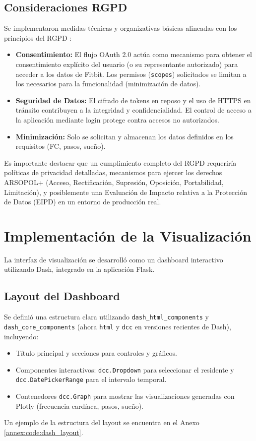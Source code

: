 \subsection{Consideraciones RGPD}
Se implementaron medidas técnicas y organizativas básicas alineadas con los principios del RGPD \citep{aepd_principios_rgpd}:
\begin{itemize}
    \item \textbf{Consentimiento:} El flujo OAuth 2.0 actúa como mecanismo para obtener el consentimiento explícito del usuario (o su representante autorizado) para acceder a los datos de Fitbit. Los permisos (\texttt{scopes}) solicitados se limitan a los necesarios para la funcionalidad (minimización de datos).
    \item \textbf{Seguridad de Datos:} El cifrado de tokens en reposo y el uso de HTTPS en tránsito contribuyen a la integridad y confidencialidad. El control de acceso a la aplicación mediante login protege contra accesos no autorizados.
    \item \textbf{Minimización:} Solo se solicitan y almacenan los datos definidos en los requisitos (FC, pasos, sueño).
\end{itemize}
Es importante destacar que un cumplimiento completo del RGPD requeriría políticas de privacidad detalladas, mecanismos para ejercer los derechos ARSOPOL+ (Acceso, Rectificación, Supresión, Oposición, Portabilidad, Limitación), y posiblemente una Evaluación de Impacto relativa a la Protección de Datos (EIPD) en un entorno de producción real.

\section{Implementación de la Visualización}
\label{sec:impl_visualizacion}

La interfaz de visualización se desarrolló como un dashboard interactivo utilizando Dash, integrado en la aplicación Flask.

\subsection{Layout del Dashboard}
Se definió una estructura clara utilizando \texttt{dash\_html\_components} y \texttt{dash\_core\_components} (ahora \texttt{html} y \texttt{dcc} en versiones recientes de Dash), incluyendo:
\begin{itemize}
    \item Título principal y secciones para controles y gráficos.
    \item Componentes interactivos: \texttt{dcc.Dropdown} para seleccionar el residente y \texttt{dcc.DatePickerRange} para el intervalo temporal.
    \item Contenedores \texttt{dcc.Graph} para mostrar las visualizaciones generadas con Plotly (frecuencia cardíaca, pasos, sueño).
\end{itemize}
Un ejemplo de la estructura del layout se encuentra en el Anexo \ref{annex:code:dash_layout}.

